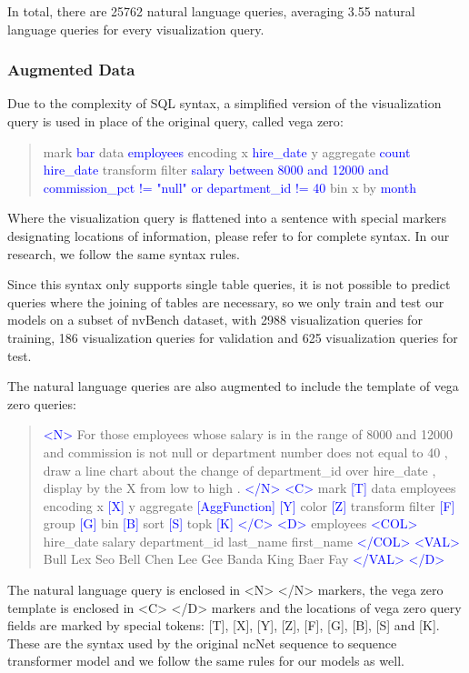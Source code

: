 \documentclass[
	a4paper, %
	10pt, %
	unnumberedsections, %
	twoside, %
]{t0003}
\newcommand{\blue}[1]{\textcolor{blue}{#1}}
\begin{document}
In total, there are 25762 natural language queries, averaging 3.55 natural language queries for every visualization query.

\subsubsection{Augmented Data}

Due to the complexity of SQL syntax, a simplified version of the visualization query is used in place of the original query, called vega zero\cite{Luo:2022qr}:

\begin{quote}
mark \blue{bar} data \blue{employees} encoding x \blue{hire\_date} y aggregate \blue{count hire\_date} transform filter \blue{salary between 8000 and 12000 and commission\_pct != "null" or department\_id != 40} bin x by \blue{month}	
\end{quote}

Where the visualization query is flattened into a sentence with special markers designating locations of information, please refer to \cite{Luo:2022qr} for complete syntax. In our research, we follow the same syntax rules.

Since this syntax only supports single table queries, it is not possible to predict queries where the joining of tables are necessary, so we only train and test our models on a subset of nvBench dataset, with 2988 visualization queries for training, 186 visualization queries for validation and 625 visualization queries for test.

The natural language queries are also augmented to include the template of vega zero queries:

\begin{quote}
\blue{<N>} For those employees whose salary is in the range of 8000 and 12000 and commission is not null or department number does not equal to 40 , draw a line chart about the change of department\_id over hire\_date , display by the X from low to high . \blue{</N>} \blue{<C>} mark \blue{[T]} data employees encoding x  \blue{[X]} y aggregate  \blue{[AggFunction] [Y]} color \blue{[Z]} transform filter \blue{[F]} group \blue{[G]} bin \blue{[B]} sort \blue{[S]} topk \blue{[K] </C> <D>} employees \blue{<COL>} hire\_date salary department\_id last\_name first\_name \blue{</COL> <VAL>} Bull Lex Seo Bell Chen Lee Gee Banda King Baer Fay \blue{</VAL> </D>}
\end{quote}

The natural language query is enclosed in <N> </N> markers, the vega zero template is enclosed in <C> </D> markers and the locations of vega zero query fields are marked by special tokens: [T], [X], [Y], [Z], [F], [G], [B], [S] and [K]. These are the syntax used by the original ncNet sequence to sequence transformer model and we follow the same rules for our models as well.
\end{document}
